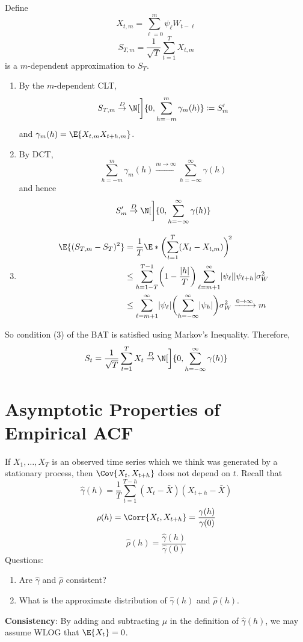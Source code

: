 \begin{Proof}{}{}
    Define
    \[ X_{t,m}=\sum_{\ell=0}^{m} \psi_\ell W_{t-\ell} \]
    \[ S_{T,m}=\frac{1}{\sqrt{T}} \sum_{t=1}^{T} X_{t,m} \]
    is a $ m $-dependent approximation to $ S_T $.
    \begin{enumerate}[(1)]
        \item By the $ m $-dependent CLT,
              \[ S_{T,m}\stackrel{D}{\to}\N[\bigg]{0,\sum_{h=-m}^{m} \gamma_m(h)}\coloneq
                  S_m^\prime \]
              and $ \gamma_m(h)=\E{X_{t,m}X_{t+h,m}} $.
        \item By DCT,
              \[ \sum_{h=-m}^{m} \gamma_m(h)
                  \xrightarrow{m\to\infty}\sum_{h=-\infty}^{\infty} \gamma(h) \]
              and hence
              \[ S_m^\prime\stackrel{D}{\to}\N[\bigg]{0,\sum_{h=-\infty}^{\infty} \gamma(h)} \]
        \item \begin{align*}
                  \E{(S_{T,m}-S_T)^2}
                   & =\frac{1}{T} \E*{\biggl(\sum_{t=1}^{T}(X_t-X_{t,m}) \biggr)^{\!2}} \\
                   & \le \sum_{h=1-T}^{T-1} \biggl(1-\frac{\abs{h}}{T} \biggr)
                  \sum_{\ell=m+1}^{\infty}\abs{\psi_\ell}\abs{\psi_{\ell+h}}\sigma_W^2  \\
                   & \le \sum_{\ell=m+1}^{\infty} \abs{\psi_\ell}
                  \biggl(\sum_{h=-\infty}^{\infty} \abs{\psi_h}\biggr)\sigma_W^2\xrightarrow{0\to\infty}m
              \end{align*}
    \end{enumerate}
    So condition (3) of the BAT is satisfied using Markov's Inequality. Therefore,
    \[ S_t=\frac{1}{\sqrt{T}}\sum_{t=1}^{T} X_t\stackrel{D}{\to}\N[\bigg]{0,\sum_{h=-\infty}^{\infty} \gamma(h)}  \]
\end{Proof}
\section{Asymptotic Properties of Empirical ACF}
If $ X_1,\ldots,X_T $ is an observed time series
which we think was generated by a stationary process, then
$ \Cov{X_t,X_{t+h}} $ does not depend on $ t $. Recall that
\[ \hat{\gamma}(h)=\frac{1}{T} \sum_{t=1}^{T-h}(X_t-\bar{X})(X_{t+h}-\bar{X}) \]
\[ \rho(h)=\Corr{X_t,X_{t+h}}=\frac{\gamma(h)}{\gamma(0)} \]
\[ \hat{\rho}(h)=\frac{\hat{\gamma}(h)}{\hat{\gamma}(0)}  \]
Questions:
\begin{enumerate}[(1)]
    \item Are $ \hat{\gamma} $ and $ \hat{\rho} $ consistent?
    \item What is the approximate distribution of $ \hat{\gamma}(h) $
          and $ \hat{\rho}(h) $.
\end{enumerate}
\textbf{Consistency}: By adding and subtracting $ \mu $ in the definition
of $ \hat{\gamma}(h) $, we may assume WLOG that $ \E{X_t}=0 $.

